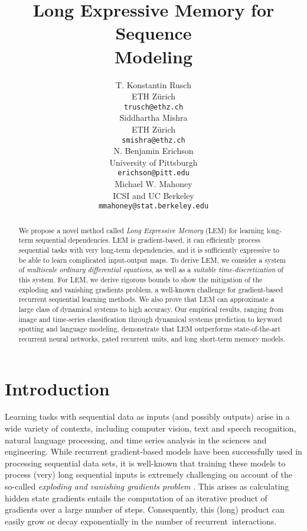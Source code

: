 \documentclass{article} \usepackage{iclr2022_conference,times}
\title{Long Expressive Memory for Sequence \\Modeling}
\author{T. Konstantin Rusch \\
ETH Z\"urich\\
\texttt{trusch@ethz.ch}\\
\And 
Siddhartha Mishra\\
ETH Z\"urich \\
\texttt{smishra@ethz.ch}\\
\And
N. Benjamin Erichson \\
University of Pittsburgh \\
\texttt{erichson@pitt.edu}\\
\And
Michael W. Mahoney \\
ICSI and UC Berkeley\\
\texttt{mmahoney@stat.berkeley.edu}\\
}
\begin{document}
\maketitle

\begin{abstract}
We propose a novel method called \emph{Long Expressive Memory} (LEM) for learning long-term sequential dependencies.  
LEM is gradient-based, it can efficiently process sequential tasks with very long-term dependencies, and it is sufficiently expressive to be able to learn complicated input-output maps.
To derive LEM, we consider a system of \emph{multiscale ordinary differential equations}, as well as a \emph{suitable time-discretization} of this system.
For LEM, we derive rigorous bounds to show the mitigation of the exploding and vanishing gradients problem, a well-known challenge for gradient-based recurrent sequential learning methods. 
We also prove that LEM can approximate a large class of dynamical systems to high accuracy. 
Our empirical results, ranging from image and time-series classification through dynamical systems prediction to keyword spotting and language modeling, demonstrate that LEM outperforms state-of-the-art recurrent neural networks, gated recurrent units, and long short-term memory models.
\end{abstract}



\section{Introduction}
Learning tasks with sequential data as inputs (and possibly outputs) arise in a wide variety of contexts, including computer vision, text and speech recognition, natural language processing, and time series analysis in the sciences and engineering. 
While recurrent gradient-based models have been successfully used in processing sequential data sets, it is well-known that training these models to process (very) long sequential inputs is extremely challenging on account of the so-called \emph{exploding and vanishing gradients problem} \citep{vanish_grad}.
This arises as calculating hidden state gradients entails the computation of an iterative product of gradients over a large number of steps. 
Consequently, this (long) product can easily grow or decay exponentially in the number of recurrent~interactions. 
\end{document}
